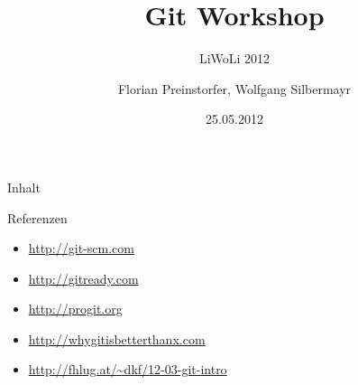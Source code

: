 \documentclass[%
]{beamer}
\title{Git Workshop}
\subtitle{LiWoLi 2012}
\author[Florian Preinstorfer, Wolfgang Silbermayr]{Florian Preinstorfer, Wolfgang Silbermayr}
\date[LiWoLi - 25.05.2012]{25.05.2012}
\begin{document}
\frame[plain]{\titlepage}

\begin{frame}{Inhalt}
  \tableofcontents
\end{frame}






\begin{frame}{Referenzen}
\begin{itemize}
  \item \url{http://git-scm.com}
  \item \url{http://gitready.com}
  \item \url{http://progit.org}
  \item \url{http://whygitisbetterthanx.com}
  \item \url{http://fhlug.at/~dkf/12-03-git-intro}
\end{itemize}
\end{frame}

\frame[plain]{\titlepage}
\end{document}
